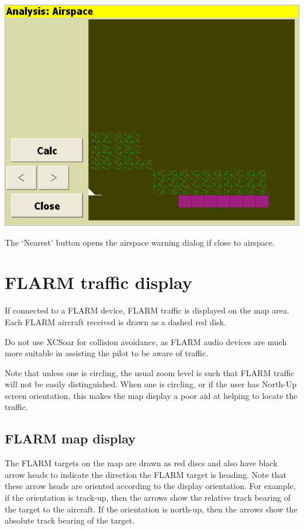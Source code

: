 \documentclass[a4paper,12pt]{refrep}
\begin{document}
\begin{center}
\includegraphics[angle=0,width=\linewidth,keepaspectratio='true']{figures/analysis-airspace.png}
\end{center}

The `Nearest' button opens the airspace warning dialog if close to
airspace.

\section{FLARM traffic display}

If connected to a FLARM device, FLARM traffic is displayed on the map
area.  Each FLARM aircraft received is drawn as a dashed red disk.

\warning Do not use XCSoar for collision avoidance, as
FLARM audio devices are much more suitable in assisting the pilot to be
aware of traffic.

Note that unless one is circling, the usual zoom level is such that
FLARM traffic will not be easily distinguished.  When one is circling,
or if the user has North-Up screen orientation, this makes the map display 
a poor aid at helping to locate the traffic.

\subsection*{FLARM map display}

The FLARM targets on the map are drawn as red discs and also have
black arrow heads to indicate the direction the FLARM target is
heading.  Note that these arrow heads are oriented according to the
display orientation.  For example, if the orientation is track-up,
then the arrows show the relative track bearing of the target to the
aircraft.  If the orientation is north-up, then the arrows show the
absolute track bearing of the target.
\end{document}
